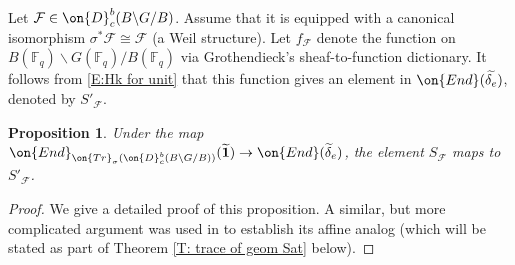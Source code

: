 \documentclass[11pt]{amsart}
\newtheorem{prop}[thm]{Proposition}
\theoremstyle{definition}
\theoremstyle{definition}
\theoremstyle{definition}
\numberwithin{equation}{subsection}
\newcommand{\bF}{{\mathbb F}}
\newcommand{\mF}{{\mathcal F}}
\newcommand{\End}{{\on{End}}}
\newcommand{\Tr}{{\on{Tr}}}
\begin{document}
Let $\mF\in \on{D}_c^b(B\backslash G/B)$. Assume that it is equipped with a canonical isomorphism $\sigma^*\mF\cong \mF$ (a Weil structure). Let $f_\mF$ denote the function on $B(\bF_q)\backslash G(\bF_q)/B(\bF_q)$ via Grothendieck's sheaf-to-function dictionary. It follows from \eqref{E:Hk for unit}  that this function gives an element in $\End(\widetilde{\delta_e})$, denoted by $S'_\mF$.
\begin{prop}
\label{P:S=T finite}
Under the map $\End_{\Tr_{\sigma}(\on{D}^b_c(B\backslash G/B))}(\widetilde{\mathbf{1}})\to \End (\widetilde{\delta}_e)$, the element $S_\mF$ maps to $S'_{\mF}$.
\end{prop}
\begin{proof}
We give a detailed proof of this proposition. 
A similar, but more complicated argument was used in \cite[\S 6.3]{XZ} to establish its affine analog (which will be stated as part of Theorem \ref{T: trace of geom Sat} below). 




\end{proof}
\end{document}
